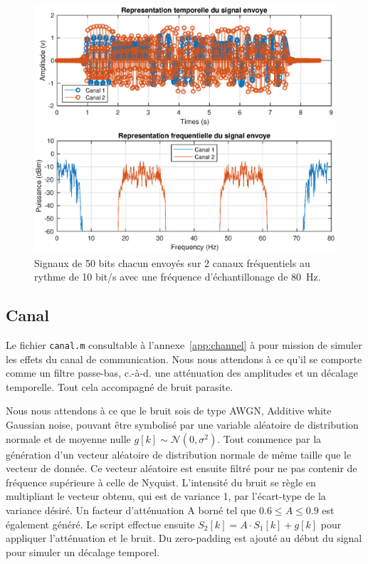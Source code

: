 \documentclass[10pt, oneside, a4paper]{article}
\begin{document}
\begin{figure}[htbp]
	\centering
	\includegraphics[height=0.45\textheight]{eps/sender.eps}
	\caption{Signaux de 50 bits chacun envoyés sur 2 canaux fréquentiels au rythme de 10 bit/s
			 avec une fréquence d'échantillonage de \SI{80}{\hertz}.}
	\label{fig:sender}
\end{figure}

\subsection{Canal}
Le fichier \texttt{canal.m} consultable à l'annexe~\ref{app:channel} à pour mission de simuler les effets du canal de communication.
Nous nous attendons à ce qu'il se comporte comme un filtre passe-bas, c.-à-d. une atténuation des amplitudes et un décalage temporelle.
Tout cela accompagné de bruit parasite.

Nous nous attendons à ce que le bruit sois de type AWGN, Additive white Gaussian noise, pouvant être symbolisé par une variable aléatoire de distribution normale et de moyenne nulle $g[k]\sim\mathcal{N}(0,\sigma^2)$.
Tout commence par la génération d'un vecteur aléatoire de distribution normale de même taille que le vecteur de donnée.
Ce vecteur aléatoire est ensuite filtré pour ne pas contenir de fréquence supérieure à celle de Nyquist.
L'intensité du bruit se règle en multipliant le vecteur obtenu, qui est de variance 1, par l'écart-type de la variance désiré.
Un facteur d'atténuation A borné tel que $\num{0.6} \leq A \leq \num{0.9}$ est également généré.
Le script effectue ensuite $S_2[k] = A \cdot S_1[k] + g[k]$ pour appliquer l'atténuation et le bruit.
Du \og{}zero-padding\fg{} est ajouté au début du signal pour simuler un décalage temporel.
\end{document}
